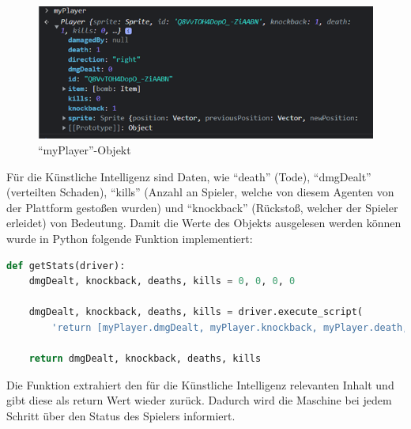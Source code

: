 \begin{figure}[H]
    \centering
    \includegraphics[scale=1]{pics/ai/myPlayer.png}
    \caption{``myPlayer''-Objekt}
    \label{fig:ai:myPlayerPic}
\end{figure}

Für die Künstliche Intelligenz sind Daten, wie ``death'' (Tode), ``dmgDealt'' (verteilten Schaden), ``kills'' (Anzahl an Spieler, welche von diesem Agenten von der Plattform gestoßen wurden) und ``knockback'' (Rückstoß, welcher der Spieler erleidet) von Bedeutung.
Damit die Werte des Objekts ausgelesen werden können wurde in Python folgende Funktion implementiert:

\begin{lstlisting}[language=Python,label=lst:maap:getstats,caption=Informationen über den Spieler]
def getStats(driver):
    dmgDealt, knockback, deaths, kills = 0, 0, 0, 0

    dmgDealt, knockback, deaths, kills = driver.execute_script(
        'return [myPlayer.dmgDealt, myPlayer.knockback, myPlayer.death, myPlayer.kills]')

    return dmgDealt, knockback, deaths, kills
\end{lstlisting}

Die Funktion extrahiert den für die Künstliche Intelligenz relevanten Inhalt und gibt diese als return Wert wieder zurück. Dadurch wird die Maschine bei jedem Schritt über den Status des Spielers informiert.

